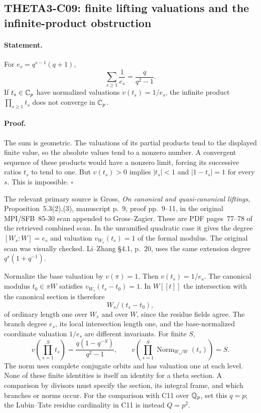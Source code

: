 \subsection{THETA3-C09: finite lifting valuations and the infinite-product obstruction}\label{C09}

\paragraph{Statement.}
For $e_s=q^{s-1}(q+1)$,
\[
 \sum_{s\geq1}\frac1{e_s}=\frac{q}{q^2-1}.
\]
If $t_s\in\mathbb C_p$ have normalized valuations $v(t_s)=1/e_s$, the
infinite product $\prod_{s\geq1}t_s$ does not converge in $\mathbb C_p$.

\paragraph{Proof.}
The sum is geometric. The valuations of its partial products tend
to the displayed finite value, so the absolute values tend to a
nonzero number. A convergent sequence of these products would have
a nonzero limit, forcing its successive ratios $t_s$ to tend to
one. But $v(t_s)>0$ implies $|t_s|<1$ and $|1-t_s|=1$ for every
$s$. This is impossible. $\square$

The relevant primary source is Gross, \emph{On canonical and
quasi-canonical liftings}, Proposition~5.3(2),(3), manuscript p.~9,
proof pp.~9--11, in the original MPI/SFB~85-30 scan appended to
Gross--Zagier. These are PDF pages~77--78 of the retrieved combined
scan. In the unramified quadratic case it gives the degree
$[W_s:W]=e_s$ and valuation $v_{W_s}(t_s)=1$ of the formal modulus.
The original scan was visually checked. Li--Zhang \S4.1, p.~20,
uses the same extension degree $q^s(1+q^{-1})$.

Normalize the base valuation by $v(\pi)=1$. Then
$v(t_s)=1/e_s$. The canonical modulus $t_0\in\pi W$ satisfies
$v_{W_s}(t_s-t_0)=1$. In $W[[t]]$ the intersection with the canonical
section is therefore
\[
 W_s/(t_s-t_0),
\]
of ordinary length one over $W_s$ and over $W$, since the residue
fields agree. The branch degree $e_s$, its local intersection
length one, and the base-normalized coordinate valuation $1/e_s$
are different invariants. For finite $S$,
\[
 v\left(\prod_{s=1}^St_s\right)
 =\frac{q(1-q^{-S})}{q^2-1},\qquad
 v\left(\prod_{s=1}^S
             \operatorname{Norm}_{W_s/W}(t_s)\right)=S.
\]
The norm uses complete conjugate orbits and has valuation one at
each level. None of these finite identities is itself an identity
for a theta section. A comparison by divisors must specify the
section, its integral frame, and which branches or norms occur.
For the comparison with C11 over $\mathbb Q_p$, set this $q=p$; the
Lubin--Tate residue cardinality in C11 is instead $Q=p^2$.

